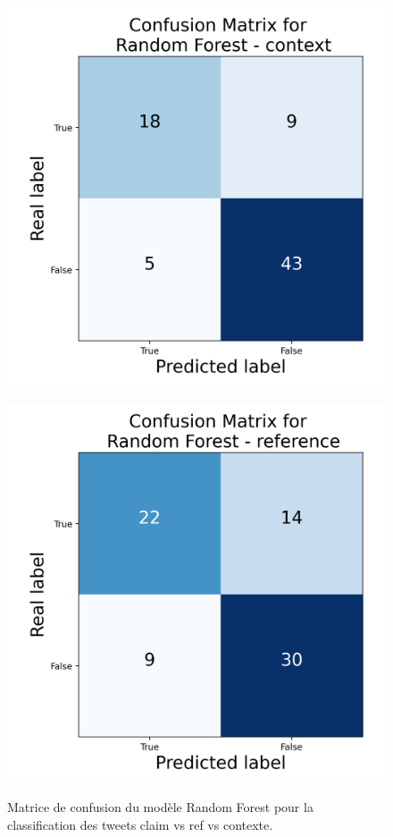 \begin{figure}[h]
\begin{minipage}[b]{0.33\textwidth}
        \includegraphics[width=\textwidth]{images/confusion_3.json-Random Forest_context_confusion_matrix}
        \label{fig:confusion_3_2}
    \end{minipage}
    \hspace{-1em}
    \begin{minipage}[b]{0.33\textwidth}
        \centering
        \includegraphics[width=\textwidth]{images/confusion_3.json-Random Forest_reference_confusion_matrix}
        \label{fig:confusion_3_3}
    \end{minipage}
    \caption{Matrice de confusion du modèle Random Forest pour la classification des tweets claim vs ref vs contexte.}
    \label{fig:confusion_3}
\end{figure}
